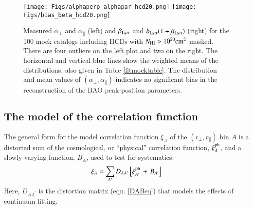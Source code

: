 \documentclass{aa}
\newcommand{\xicosmo}{\xi^{\rm ph}}
\newcommand{\xif}{\xi}
\newcommand{\apar}{\alpha_\parallel}
\newcommand{\aperp}{\alpha_\perp}
\newcommand{\rperp}{r_\perp}
\newcommand{\rpar}{r_\parallel}
\newcommand{\betalya}{\beta_{\rm Ly\alpha}}
\newcommand{\blya}{b_{\rm Ly\alpha}}
\newcommand{\NHI}{N_{\rm HI}}
\begin{document}
\begin{figure*}[tb]
\texttt{[image: Figs/alphaperp\_alphapar\_hcd20.png]}
\texttt{[image: Figs/bias\_beta\_hcd20.png]}
\caption{
Measured $\aperp$ and $\apar$ (left) and  $\betalya$ and $\blya(1+\betalya)$
(right) for the 100 mock catalogs including HCDs with $\NHI>10^{20}{\rm cm^2}$
masked.
There are four outliers on the left plot and two on the right.
The horizontal and vertical blue lines show the weighted means
of the distributions, also given in Table \ref{fitmocktable}.
The distribution and mean values of $(\aperp,\apar)$ indicates
no significant bias in the
reconstruction of the BAO peak-position parameters. 
}
\label{mocksoutputfig} 
\end{figure*}






\subsection{The model of the correlation function}
\label{fitmodelsec}


The general
form for the model correlation function $\xif_A$
of the $(\rperp,\rpar)$ bin $A$
is a distorted sum of the cosmological, or ``physical''  correlation function, $\xicosmo_A$,
and a slowly varying function, $B_A$, used to test
for systematics:
\begin{equation}
\xif_A  = \sum_{A^\prime}D_{AA^\prime}
\left[ \xicosmo_{A^\prime}
\,+\, B_{A^\prime} \right]
\label{xitheoryeq}
\end{equation}
Here, $D_{AA^\prime}$ is the distortion matrix (eqn. \ref{DABeq})
that models the effects of continuum fitting.
\end{document}
